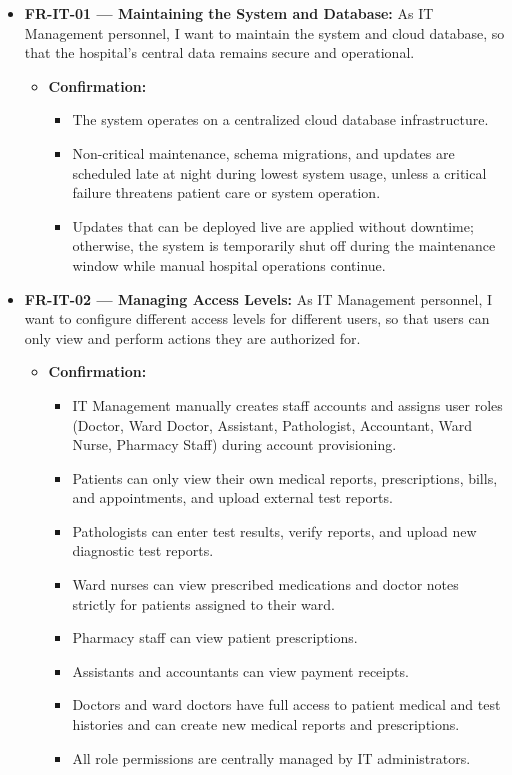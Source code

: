 \documentclass[11pt,a4paper]{article}
\begin{document}
\begin{itemize}
    \item \textbf{FR-IT-01 — Maintaining the System and Database:} As IT Management personnel, I want to maintain the system and cloud database, so that the hospital's central data remains secure and operational.
    \begin{itemize}
        \item \textbf{Confirmation:}
        \begin{itemize}
            \item The system operates on a centralized cloud database infrastructure.
            \item Non-critical maintenance, schema migrations, and updates are scheduled late at night during lowest system usage, unless a critical failure threatens patient care or system operation.
            \item Updates that can be deployed live are applied without downtime; otherwise, the system is temporarily shut off during the maintenance window while manual hospital operations continue.
        \end{itemize}
    \end{itemize}

    \item \textbf{FR-IT-02 — Managing Access Levels:} As IT Management personnel, I want to configure different access levels for different users, so that users can only view and perform actions they are authorized for.
    \begin{itemize}
        \item \textbf{Confirmation:}
        \begin{itemize}
            \item IT Management manually creates staff accounts and assigns user roles (Doctor, Ward Doctor, Assistant, Pathologist, Accountant, Ward Nurse, Pharmacy Staff) during account provisioning.
            \item Patients can only view their own medical reports, prescriptions, bills, and appointments, and upload external test reports.
            \item Pathologists can enter test results, verify reports, and upload new diagnostic test reports.
            \item Ward nurses can view prescribed medications and doctor notes strictly for patients assigned to their ward.
            \item Pharmacy staff can view patient prescriptions.
            \item Assistants and accountants can view payment receipts.
            \item Doctors and ward doctors have full access to patient medical and test histories and can create new medical reports and prescriptions.
            \item All role permissions are centrally managed by IT administrators.
        \end{itemize}
    \end{itemize}
\end{itemize}
\end{document}
